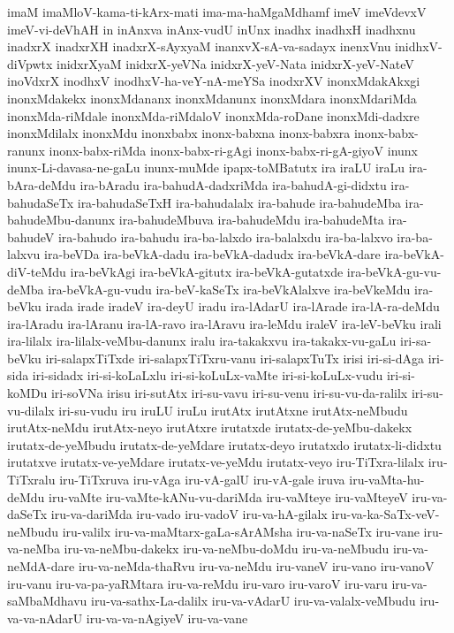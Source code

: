 {imaM
imaMloV-kama-ti-kArx-mati
ima-ma-haMgaMdhamf
imeV
imeVdevxV
imeV-vi-deVhAH
in
inAnxva
inAnx-vudU
inUnx
inadhx
inadhxH
inadhxnu
inadxrX
inadxrXH
inadxrX-sAyxyaM
inanxvX-sA-va-sadayx
inenxVnu
inidhxV-diVpwtx
inidxrXyaM
inidxrX-yeVNa
inidxrX-yeV-Nata
inidxrX-yeV-NateV
inoVdxrX
inodhxV
inodhxV-ha-veY-nA-meYSa
inodxrXV
inonxMdakAkxgi
inonxMdakekx
inonxMdananx
inonxMdanunx
inonxMdara
inonxMdariMda
inonxMda-riMdale
inonxMda-riMdaloV
inonxMda-roDane
inonxMdi-dadxre
inonxMdilalx
inonxMdu
inonxbabx
inonx-babxna
inonx-babxra
inonx-babx-ranunx
inonx-babx-riMda
inonx-babx-ri-gAgi
inonx-babx-ri-gA-giyoV
inunx
inunx-Li-davasa-ne-gaLu
inunx-muMde
ipapx-toMBatutx
ira
iraLU
iraLu
ira-bAra-deMdu
ira-bAradu
ira-bahudA-dadxriMda
ira-bahudA-gi-didxtu
ira-bahudaSeTx
ira-bahudaSeTxH
ira-bahudalalx
ira-bahude
ira-bahudeMba
ira-bahudeMbu-danunx
ira-bahudeMbuva
ira-bahudeMdu
ira-bahudeMta
ira-bahudeV
ira-bahudo
ira-bahudu
ira-ba-lalxdo
ira-balalxdu
ira-ba-lalxvo
ira-ba-lalxvu
ira-beVDa
ira-beVkA-dadu
ira-beVkA-dadudx
ira-beVkA-dare
ira-beVkA-diV-teMdu
ira-beVkAgi
ira-beVkA-gitutx
ira-beVkA-gutatxde
ira-beVkA-gu-vu-deMba
ira-beVkA-gu-vudu
ira-beV-kaSeTx
ira-beVkAlalxve
ira-beVkeMdu
ira-beVku
irada
irade
iradeV
ira-deyU
iradu
ira-lAdarU
ira-lArade
ira-lA-ra-deMdu
ira-lAradu
ira-lAranu
ira-lA-ravo
ira-lAravu
ira-leMdu
iraleV
ira-leV-beVku
irali
ira-lilalx
ira-lilalx-veMbu-danunx
iralu
ira-takakxvu
ira-takakx-vu-gaLu
iri-sa-beVku
iri-salapxTiTxde
iri-salapxTiTxru-vanu
iri-salapxTuTx
irisi
iri-si-dAga
iri-sida
iri-sidadx
iri-si-koLaLxlu
iri-si-koLuLx-vaMte
iri-si-koLuLx-vudu
iri-si-koMDu
iri-soVNa
irisu
iri-sutAtx
iri-su-vavu
iri-su-venu
iri-su-vu-da-ralilx
iri-su-vu-dilalx
iri-su-vudu
iru
iruLU
iruLu
irutAtx
irutAtxne
irutAtx-neMbudu
irutAtx-neMdu
irutAtx-neyo
irutAtxre
irutatxde
irutatx-de-yeMbu-dakekx
irutatx-de-yeMbudu
irutatx-de-yeMdare
irutatx-deyo
irutatxdo
irutatx-li-didxtu
irutatxve
irutatx-ve-yeMdare
irutatx-ve-yeMdu
irutatx-veyo
iru-TiTxra-lilalx
iru-TiTxralu
iru-TiTxruva
iru-vAga
iru-vA-galU
iru-vA-gale
iruva
iru-vaMta-hu-deMdu
iru-vaMte
iru-vaMte-kANu-vu-dariMda
iru-vaMteye
iru-vaMteyeV
iru-va-daSeTx
iru-va-dariMda
iru-vado
iru-vadoV
iru-va-hA-gilalx
iru-va-ka-SaTx-veV-neMbudu
iru-valilx
iru-va-maMtarx-gaLa-sArAMsha
iru-va-naSeTx
iru-vane
iru-va-neMba
iru-va-neMbu-dakekx
iru-va-neMbu-doMdu
iru-va-neMbudu
iru-va-neMdA-dare
iru-va-neMda-thaRvu
iru-va-neMdu
iru-vaneV
iru-vano
iru-vanoV
iru-vanu
iru-va-pa-yaRMtara
iru-va-reMdu
iru-varo
iru-varoV
iru-varu
iru-va-saMbaMdhavu
iru-va-sathx-La-dalilx
iru-va-vAdarU
iru-va-valalx-veMbudu
iru-va-va-nAdarU
iru-va-va-nAgiyeV
iru-va-vane
}
